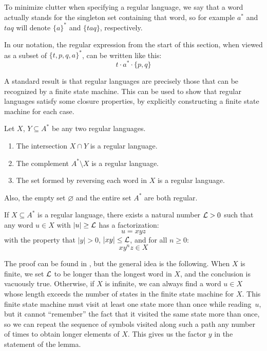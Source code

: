 \documentclass[../generics]{subfiles}
\begin{document}
To minimize clutter when specifying a regular language, we say that a word actually stands for the singleton set containing that word, so for example $a^*$ and $taq$ will denote $\{a\}^*$ and $\{taq\}$, respectively.

\begin{example}
In our notation, the regular expression from the start of this section, when viewed as a subset of $\{t,p,q,a\}^*$, can be written like this:
\[
t \cdot a^* \cdot \{p,q\}
\]
\end{example}

A standard result is that regular languages are precisely those that can be recognized by a finite state machine. This can be used to show that regular languages satisfy some closure properties, by explicitly constructing a finite state machine for each case.

\begin{lemma}\label{lemma:regular language closure}
Let $X$, $Y \subseteq A^*$ be any two regular languages.
\begin{enumerate}
\item The intersection $X \cap Y$ is a regular language.
\item The complement $A^* \setminus X$ is a regular language.
\item The set formed by reversing each word in $X$ is a regular language.
\end{enumerate}
Also, the empty set $\varnothing$ and the entire set $A^*$ are both regular.
\end{lemma}

\begin{lemma}\label{pumping lemma}
If $X \subseteq A^*$ is a regular language, there exists a natural number $\mathcal{L} > 0$ such that any word $u \in X$ with $|u| \geq \mathcal{L}$ has a factorization:
\[
u = xyz
\]
with the property that $|y| > 0$, $|xy| \leq \mathcal{L}$, and for all $n \geq 0$:
\[
xy^nz \in X
\]
\end{lemma}

The proof can be found in \cite{transductions}, but the general idea is the following. When $X$ is finite, we set $\mathcal{L}$ to be longer than the longest word in $X$, and the conclusion is vacuously true. Otherwise, if $X$ is infinite, we can always find a word $u \in X$ whose length exceeds the number of states in the finite state machine for $X$. This finite state machine must visit at least one state more than once while reading~$u$, but it cannot ``remember'' the fact that it visited the same state more than once, so we can repeat the sequence of symbols visited along such a path any number of times to obtain longer elements of $X$. This gives us the factor $y$ in the statement of the lemma.
\end{document}
